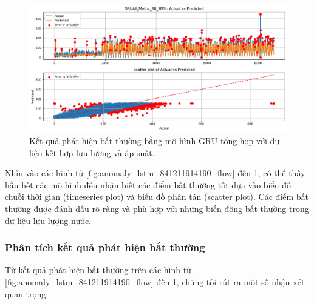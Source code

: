 \begin{figure}[H]
    \centering
    \includegraphics[width=\textwidth]{image/section6_3/anomaly_detection_combined_gru_allmetric.png}
    \caption{Kết quả phát hiện bất thường bằng mô hình GRU tổng hợp với dữ liệu kết hợp lưu lượng và áp suất.}
    \label{fig:anomaly_combined_gru_all}
\end{figure}

Nhìn vào các hình từ \ref{fig:anomaly_lstm_841211914190_flow} đến \ref{fig:anomaly_combined_gru_all}, có thể thấy hầu hết các mô hình đều nhận biết các điểm bất thường tốt dựa vào biểu đồ chuỗi thời gian (timeseries plot) và biểu đồ phân tán (scatter plot). Các điểm bất thường được đánh dấu rõ ràng và phù hợp với những biến động bất thường trong dữ liệu lưu lượng nước.

\subsubsection{Phân tích kết quả phát hiện bất thường}

Từ kết quả phát hiện bất thường trên các hình từ \ref{fig:anomaly_lstm_841211914190_flow} đến \ref{fig:anomaly_combined_gru_all}, chúng tôi rút ra một số nhận xét quan trọng:

